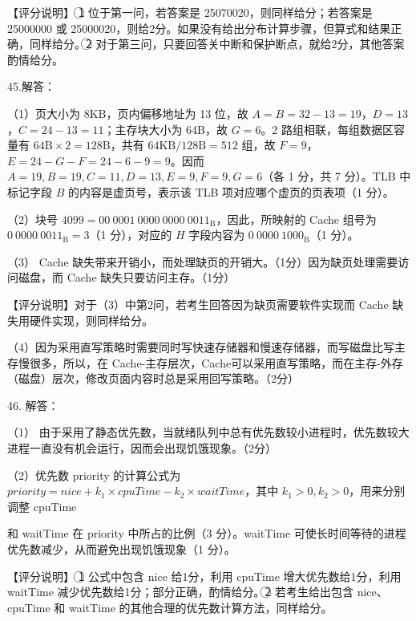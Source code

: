 \documentclass[UTF8,11pt]{ctexart}
\begin{document}
【评分说明】 \textcircled{1} 位于第一问，若答案是 25070020，则同样给分；若答案是 25000000 或 25000020，则给2分。如果没有给出分布计算步骤，但算式和结果正确，同样给分。\textcircled{2} 对于第三问，只要回答关中断和保护断点，就给2分，其他答案酌情给分。


45.解答：


（1）页大小为 8KB，页内偏移地址为 13 位，故 \(\displaystyle A=B=32-13=19\)，\(\displaystyle D=13\)，\(\displaystyle C=24-13=11\)；主存块大小为 64B，故 \(\displaystyle G=6\)。2 路组相联，每组数据区容量有 \(\displaystyle 64\mathrm{B}\times2=128\mathrm{B}\)，共有 \(\displaystyle 64\mathrm{KB}/128\mathrm{B}=512\) 组，故 \(\displaystyle F=9\)，\(\displaystyle E=24-G-F=24-6-9=9\)。因而 \(\displaystyle A=19,\allowbreak B=19,\allowbreak C=11,\allowbreak D=13,\allowbreak E=9,\allowbreak F=9,\allowbreak G=6\)（各 1 分，共 7 分）。TLB 中标记字段 \(\displaystyle B\) 的内容是虚页号，表示该 TLB 项对应哪个虚页的页表项（1 分）。


（2）块号 \(\displaystyle 4099=00\ 0001\ 0000\ 0000\ 0011_\mathrm{B}\)，因此，所映射的 Cache 组号为 \(\displaystyle 0\ 0000\ 0011_\mathrm{B}=3\)（1 分），对应的 \(\displaystyle H\) 字段内容为 \(\displaystyle 0\ 0000\ 1000_\mathrm{B}\)（1 分）。


（3） Cache 缺失带来开销小，而处理缺页的开销大。（1分）因为缺页处理需要访问磁盘，而 Cache 缺失只要访问主存。（1分）


【评分说明】对于（3）中第2问，若考生回答因为缺页需要软件实现而 Cache 缺失用硬件实现，则同样给分。


（4）因为采用直写策略时需要同时写快速存储器和慢速存储器，而写磁盘比写主存慢很多，所以，在 Cache-主存层次，Cache可以采用直写策略，而在主存-外存（磁盘）层次，修改页面内容时总是采用回写策略。（2分）


46. 解答：


（1） 由于采用了静态优先数，当就绪队列中总有优先数较小进程时，优先数较大进程一直没有机会运行，因而会出现饥饿现象。（2分）


（2）优先数 priority 的计算公式为 \(\displaystyle priority=nice+k_1\times cpuTime-k_2\times waitTime\)，其中 \(\displaystyle k_1>0,\allowbreak k_2>0\)，用来分别调整 cpuTime


和 waitTime 在 priority 中所占的比例（3 分）。waitTime 可使长时间等待的进程优先数减少，从而避免出现饥饿现象（1 分）。


【评分说明】 \textcircled{1} 公式中包含 nice 给1分，利用 cpuTime 增大优先数给1分，利用 waitTime 减少优先数给1分；部分正确，酌情给分。\textcircled{2} 若考生给出包含 nice、cpuTime 和 waitTime 的其他合理的优先数计算方法，同样给分。
\end{document}
